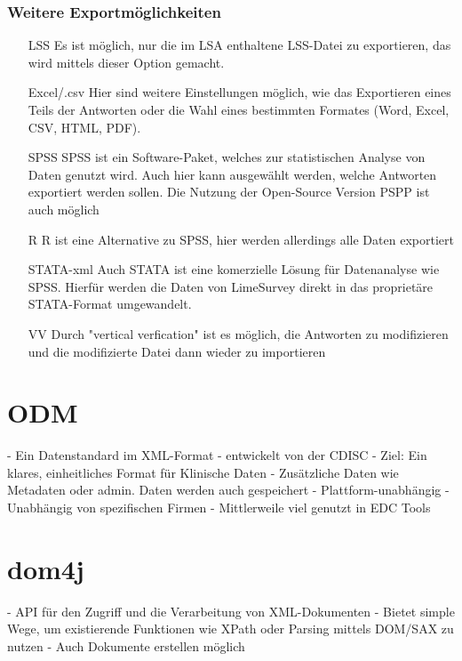 \subsubsection{Weitere Exportmöglichkeiten}
\begin{itemize}
	\item[LSS] Es ist möglich, nur die im LSA enthaltene LSS-Datei zu exportieren, das wird mittels dieser Option gemacht.
	\item[Excel/.csv] Hier sind weitere Einstellungen möglich, wie das Exportieren eines Teils der Antworten oder die Wahl eines bestimmten Formates (Word, Excel, CSV, HTML, PDF).
	\item[SPSS] SPSS ist ein Software-Paket, welches zur statistischen Analyse von Daten genutzt wird. Auch hier kann ausgewählt werden, welche Antworten exportiert werden sollen. Die Nutzung der Open-Source Version PSPP ist auch möglich
	\item[R] R ist eine Alternative zu SPSS, hier werden allerdings alle Daten exportiert
	\item[STATA-xml] Auch STATA ist eine komerzielle Lösung für Datenanalyse wie SPSS. Hierfür werden die Daten von LimeSurvey direkt in das proprietäre STATA-Format umgewandelt.
	\item[VV] Durch "vertical verfication" ist es möglich, die Antworten zu modifizieren und die modifizierte Datei dann wieder zu importieren
\end{itemize}

\section{ODM}
- Ein Datenstandard im XML-Format
- entwickelt von der CDISC
- Ziel: Ein klares, einheitliches Format für Klinische Daten
- Zusätzliche Daten wie Metadaten oder admin. Daten werden auch gespeichert
- Plattform-unabhängig
- Unabhängig von spezifischen Firmen
- Mittlerweile viel genutzt in EDC Tools

\section{dom4j}

- API für den Zugriff und die Verarbeitung von XML-Dokumenten
- Bietet simple Wege, um existierende Funktionen wie XPath oder Parsing mittels DOM/SAX zu nutzen
- Auch Dokumente erstellen möglich

